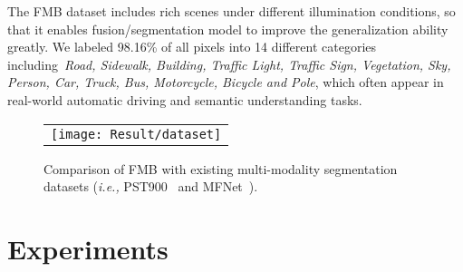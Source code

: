 \documentclass[10pt,twocolumn,letterpaper]{article}
\begin{document}
The FMB dataset includes rich scenes under different illumination conditions, so that it enables fusion/segmentation model to improve the generalization ability greatly. We labeled 98.16\% of all pixels into 14 different categories including~\emph{Road, Sidewalk, Building, Traffic Light, Traffic Sign, Vegetation, Sky, Person, Car, Truck, Bus, Motorcycle, Bicycle and Pole}, which often appear in real-world automatic driving and semantic understanding tasks. 

\begin{figure}[!htb]
	\centering
	\setlength{\tabcolsep}{1pt}
	\begin{tabular}{c}
		
		\texttt{[image: Result/dataset]}
		\\ 				
	\end{tabular}
	\caption{Comparison of FMB with existing  multi-modality segmentation datasets (\textit{i.e.,} PST900~\cite{shivakumar2020pst900} and MFNet~\cite{ha2017mfnet}).}
	\label{fig:MMSPdatasets}
\end{figure}


\section{Experiments}
\end{document}
